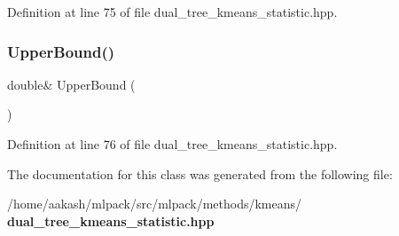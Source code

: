 Definition at line 75 of file dual\+\_\+tree\+\_\+kmeans\+\_\+statistic.\+hpp.

\mbox{\label{classmlpack_1_1kmeans_1_1DualTreeKMeansStatistic_a8ca22dd7e7fef0daedaf688ff37b5d05}} 
\subsubsection{Upper\+Bound()\hspace{0.1cm}{\footnotesize\ttfamily [2/2]}}
{\footnotesize\ttfamily double\& Upper\+Bound (\begin{DoxyParamCaption}{ }\end{DoxyParamCaption})\hspace{0.3cm}{\ttfamily [inline]}}



Definition at line 76 of file dual\+\_\+tree\+\_\+kmeans\+\_\+statistic.\+hpp.



The documentation for this class was generated from the following file\+:\begin{DoxyCompactItemize}
\item 
/home/aakash/mlpack/src/mlpack/methods/kmeans/\textbf{ dual\+\_\+tree\+\_\+kmeans\+\_\+statistic.\+hpp}\end{DoxyCompactItemize}
